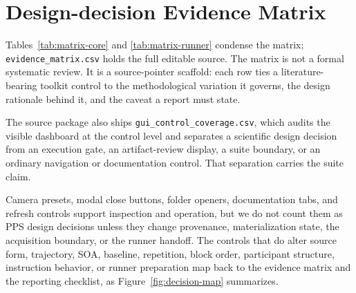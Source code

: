 \documentclass[pdflatex,sn-apa]{sn-jnl}
\newcommand{\code}[1]{\texttt{#1}}
\begin{document}
\section{Design-decision Evidence Matrix}

Tables~\ref{tab:matrix-core} and \ref{tab:matrix-runner} condense the matrix; \code{evidence\_matrix.csv} holds the full editable source. The matrix is not a formal systematic review. It is a source-pointer scaffold: each row ties a literature-bearing toolkit control to the methodological variation it governs, the design rationale behind it, and the caveat a report must state.

The source package also ships \code{gui\_control\_coverage.csv}, which audits the visible dashboard at the control level and separates a scientific design decision from an execution gate, an artifact-review display, a suite boundary, or an ordinary navigation or documentation control. That separation carries the suite claim.

Camera presets, modal close buttons, folder openers, documentation tabs, and refresh controls support inspection and operation, but we do not count them as PPS design decisions unless they change provenance, materialization state, the acquisition boundary, or the runner handoff. The controls that do alter source form, trajectory, SOA, baseline, repetition, block order, participant structure, instruction behavior, or runner preparation map back to the evidence matrix and the reporting checklist, as Figure~\ref{fig:decision-map} summarizes.
\end{document}
